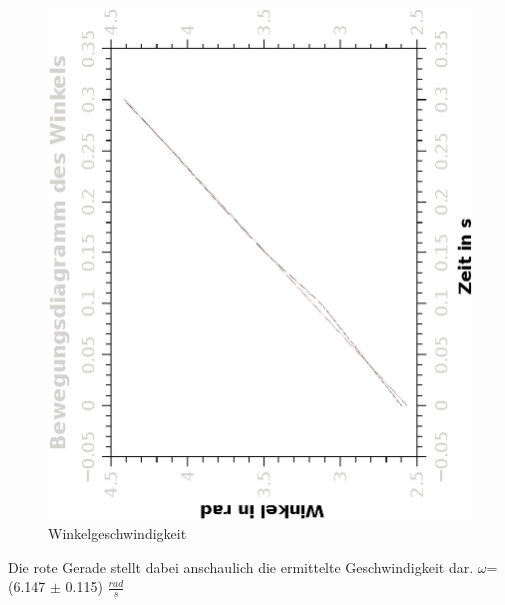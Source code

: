 \documentclass{article}
\begin{document}
\begin{figure}[H]
\caption{Winkelgeschwindigkeit}
\begin{center}
\includegraphics[scale=0.7,angle=-90]{winkelgeschw.eps}
\end{center}
\end{figure}
Die rote Gerade stellt dabei anschaulich die ermittelte Geschwindigkeit dar. 
$\omega$= (6.147 $\pm$ 0.115) $\frac{rad}{s}$
\end{document}
